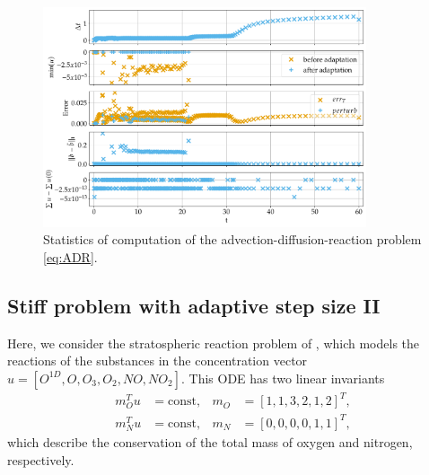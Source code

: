 \documentclass[a4paper]{article}
\numberwithin{equation}{section}
\theoremstyle{plain}
\theoremstyle{definition}
\numberwithin{theorem}{section}
\newcommand{\1}{\mathbbm{1}}
\begin{document}
\begin{figure}
\centering
\includegraphics[width=0.85\textwidth]{plots/ADP_stepsize,b.pdf}
\caption{Statistics of computation of the advection-diffusion-reaction problem \eqref{eq:ADR}.}
\label{fig:Stats_ADP}
\end{figure}


\subsection{Stiff problem with adaptive step size II}

Here, we consider the stratospheric reaction problem of
\cite{sandu2001positive}, which models the reactions of the substances
in the concentration vector $u = [O^{1D}, O, O_3, O_2, NO, NO_2]$.
This ODE has two linear invariants
\begin{align}
  m_O^T u &= \text{const}, & m_O &= [1,1,3,2,1,2]^T, \\
  m_N^T u &= \text{const}, & m_N &= [0,0,0,0,1,1]^T,
\end{align}
which describe the conservation of the total mass of oxygen and nitrogen,
respectively.
\end{document}
